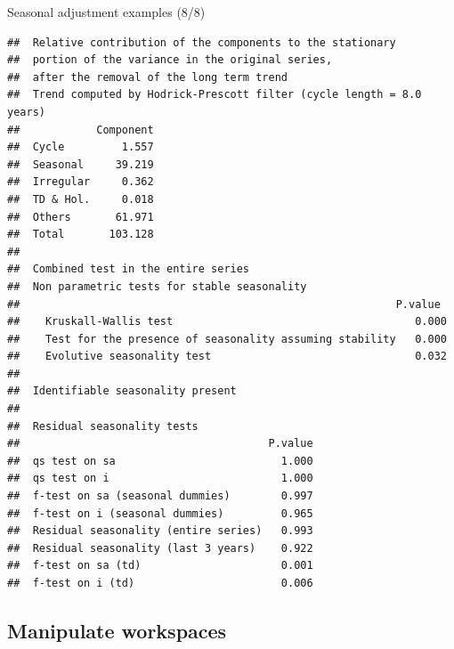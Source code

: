 \documentclass[10pt,xcolor=table,color={dvipsnames,usenames},ignorenonframetext,usepdftitle=false,french]{beamer}
\newenvironment{Shaded}{\begin{snugshade}}{\end{snugshade}}
\newcommand{\NormalTok}[1]{#1}
\newcommand{\OperatorTok}[1]{\textcolor[rgb]{0.81,0.36,0.00}{\textbf{#1}}}
\begin{document}
\begin{frame}[fragile]{Seasonal adjustment examples (8/8)}
\protect\hypertarget{seasonal-adjustment-examples-88}{}

\footnotesize

\begin{Shaded}
\end{Shaded}

\begin{verbatim}
##  Relative contribution of the components to the stationary
##  portion of the variance in the original series,
##  after the removal of the long term trend 
##  Trend computed by Hodrick-Prescott filter (cycle length = 8.0 years)
##            Component
##  Cycle         1.557
##  Seasonal     39.219
##  Irregular     0.362
##  TD & Hol.     0.018
##  Others       61.971
##  Total       103.128
## 
##  Combined test in the entire series 
##  Non parametric tests for stable seasonality
##                                                           P.value
##    Kruskall-Wallis test                                      0.000
##    Test for the presence of seasonality assuming stability   0.000
##    Evolutive seasonality test                                0.032
##  
##  Identifiable seasonality present
## 
##  Residual seasonality tests 
##                                       P.value
##  qs test on sa                          1.000
##  qs test on i                           1.000
##  f-test on sa (seasonal dummies)        0.997
##  f-test on i (seasonal dummies)         0.965
##  Residual seasonality (entire series)   0.993
##  Residual seasonality (last 3 years)    0.922
##  f-test on sa (td)                      0.001
##  f-test on i (td)                       0.006
\end{verbatim}

\end{frame}

\hypertarget{manipulate-workspaces}{%
\subsection{Manipulate workspaces}\label{manipulate-workspaces}}
\end{document}
